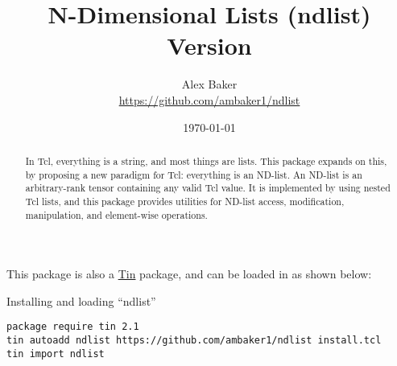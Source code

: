 \documentclass{article}
\title{\Huge{N-Dimensional Lists (ndlist)}\\\large Version \version}
\author{Alex Baker\\\small\url{https://github.com/ambaker1/ndlist}}
\date{\small\today}
\begin{document}
\maketitle
\begin{abstract}
In Tcl, everything is a string, and most things are lists. This package expands on this, by proposing a new paradigm for Tcl: everything is an ND-list. An ND-list is an arbitrary-rank tensor containing any valid Tcl value. It is implemented by using nested Tcl lists, and this package provides utilities for ND-list access, modification, manipulation, and element-wise operations.
\end{abstract}
\vspace{20 pt}

This package is also a \textcolor{blue}{\href{https://github.com/ambaker1/Tin}{Tin}} package, and can be loaded in as shown below:
\begin{example}{Installing and loading ``ndlist''}
\begin{lstlisting}
package require tin 2.1
tin autoadd ndlist https://github.com/ambaker1/ndlist install.tcl
tin import ndlist
\end{lstlisting}
\end{example}

\clearpage





{\footnotesize \printindex}
\end{document}
